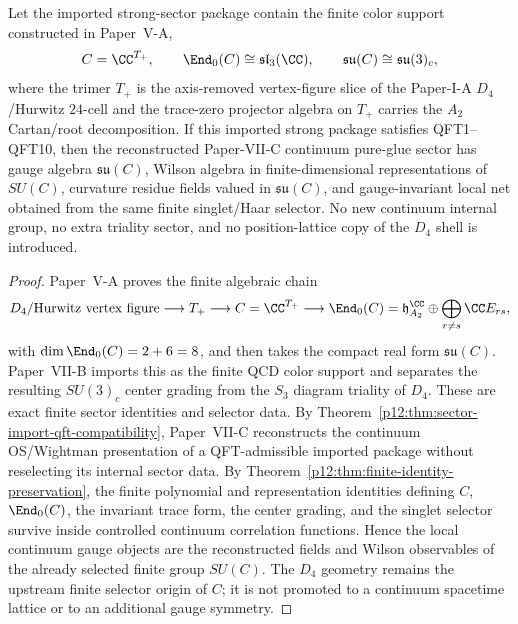 \documentclass[12pt,a4paper]{article}
\begin{document}
\begin{corollary}
\label{p12:cor:d4-a2-selector-survives-qft}
Let the imported strong-sector package contain the finite color support
constructed in Paper~V-A,
\[
C=\CC^{T_+},
\qquad
\End_0(C)\cong\mathfrak{sl}_3(\CC),
\qquad
\mathfrak{su}(C)\cong\mathfrak{su}(3)_c,
\]
where the trimer \(T_+\) is the axis-removed vertex-figure slice of the
Paper-I-A \(D_4\)/Hurwitz \(24\)-cell and the trace-zero projector algebra on
\(T_+\) carries the \(A_2\) Cartan/root decomposition.  If this imported
strong package satisfies QFT1--QFT10, then the reconstructed Paper-VII-C
continuum pure-glue sector has gauge algebra \(\mathfrak{su}(C)\), Wilson
algebra in finite-dimensional representations of \(SU(C)\), curvature
residue fields valued in \(\mathfrak{su}(C)\), and gauge-invariant local net
obtained from the same finite singlet/Haar selector.  No new continuum
internal group, no extra triality sector, and no position-lattice copy of the
\(D_4\) shell is introduced.
\end{corollary}
\begin{proof}
Paper~V-A proves the finite algebraic chain
\[
D_4\text{/Hurwitz vertex figure}
\longrightarrow
T_+
\longrightarrow
C=\CC^{T_+}
\longrightarrow
\End_0(C)=\mathfrak h_{A_2}^{\CC}\oplus
\bigoplus_{r\ne s}\CC E_{rs},
\]
with \(\dim\End_0(C)=2+6=8\), and then takes the compact real form
\(\mathfrak{su}(C)\).  Paper~VII-B imports this as the finite QCD color
support and separates the resulting \(SU(3)_c\) center grading from the
\(S_3\) diagram triality of \(D_4\).  These are exact finite sector identities
and selector data.  By Theorem~\ref{p12:thm:sector-import-qft-compatibility},
Paper~VII-C reconstructs the continuum OS/Wightman presentation of a
QFT-admissible imported package without reselecting its internal sector data.
By Theorem~\ref{p12:thm:finite-identity-preservation}, the finite polynomial
and representation identities defining \(C\), \(\End_0(C)\), the invariant
trace form, the center grading, and the singlet selector survive inside
controlled continuum correlation functions.  Hence the local continuum gauge
objects are the reconstructed fields and Wilson observables of the already
selected finite group \(SU(C)\).  The \(D_4\) geometry remains the upstream
finite selector origin of \(C\); it is not promoted to a continuum
spacetime lattice or to an additional gauge symmetry.
\end{proof}
\end{document}
